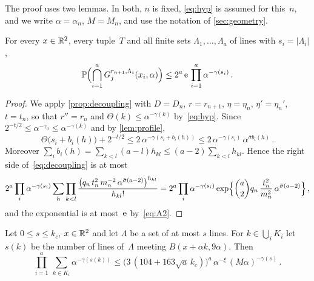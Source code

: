 \documentclass[11pt,letterpaper]{article}
\begin{document}
The proof uses two lemmas. In both, $n$ is fixed, \eqref{eq:hyp} is assumed for this~$n$, and we write $\alpha=\alpha_n$, $M=M_n$, and use the notation of \cref{sec:geometry}.

\begin{lemma}
\label{lem:free}
For every $x\in\mathbb R^2$, every tuple~$T$ and all finite sets $\Lambda_1,\dots,\Lambda_a$ of lines with $s_i=\lvert\Lambda_i\rvert$,
\begin{equation*}
  \mathbb P\Bigl(\bigcap_{i=1}^aG_j^{r_{n+1},\Lambda_i}(x_i,\alpha)\Bigr)\le2^a\,\mathrm{e}\,\prod_{i=1}^a\alpha^{-\gamma(s_i)}\,.
\end{equation*}
\end{lemma}

\begin{proof}
We apply \cref{prop:decoupling} with $D=D_n$, $r=r_{n+1}$, $\eta=\eta_n$, $\eta'=\eta_n'$, $t=t_n$, so that $r''=r_n$ and $\Theta(k)\le\alpha^{-\gamma(k)}$ by~\eqref{eq:hyp}. Since $2^{-t/2}\le\alpha^{-\gamma_0}\le\alpha^{-\gamma(k)}$ and by \cref{lem:profile},
\begin{equation*}
  \Theta\bigl(s_i+b_i(h)\bigr)+2^{-t/2}\le2\,\alpha^{-\gamma(s_i+b_i(h))}\le2\,\alpha^{-\gamma(s_i)}\,\alpha^{\bar\sigma b_i(h)}\,.
\end{equation*}
Moreover $\sum_ib_i(h)=\sum_{k<l}(a-l)h_{kl}\le(a-2)\sum_{k<l}h_{kl}$. Hence the right side of~\eqref{eq:decoupling} is at most
\begin{equation*}
  2^a\prod_i\alpha^{-\gamma(s_i)}\sum_h\prod_{k<l}\frac{\bigl(q_n\,t_n^2\,m_n^{-2}\,\alpha^{\bar\sigma(a-2)}\bigr)^{h_{kl}}}{h_{kl}!}=2^a\prod_i\alpha^{-\gamma(s_i)}\exp\Bigl\{\binom a2q_n\,\frac{t_n^2}{m_n^2}\,\alpha^{\bar\sigma(a-2)}\Bigr\}\,,
\end{equation*}
and the exponential is at most~$\mathrm{e}$ by~\eqref{eq:A2}.
\end{proof}

\begin{lemma}[Counting]
\label{lem:counting}
Let $0\le s\le k_c$, $x\in\mathbb R^2$ and let $\Lambda$ be a set of at most $s$ lines. For $k\in\bigcup_iK_i$ let $s(k)$ be the number of lines of~$\Lambda$ meeting $B(x+\alpha k,9\alpha)$. Then
\begin{equation*}
  \prod_{i=1}^a\ \sum_{k\in K_i}\alpha^{-\gamma(s(k))}\le\bigl(3\,(104+163\sqrt a\,k_c)\bigr)^a\,\alpha^{-\xi}\,(M\alpha)^{-\gamma(s)}\,.
\end{equation*}
\end{lemma}
\end{document}
